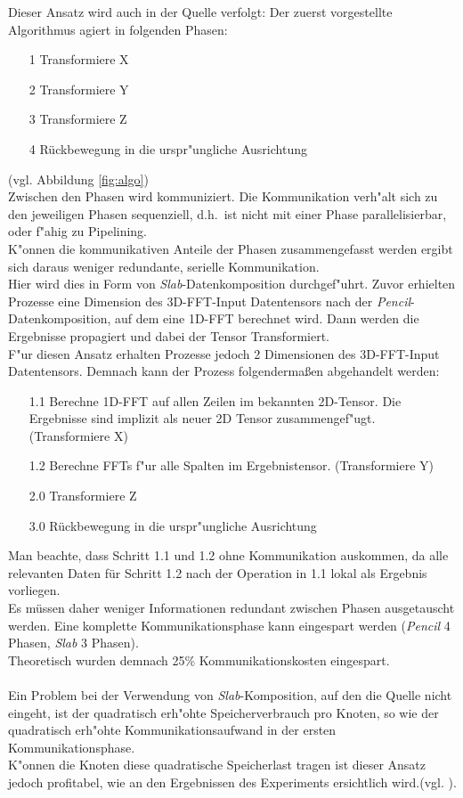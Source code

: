 Dieser Ansatz wird auch in der Quelle \cite{mainpaper} verfolgt:
Der zuerst vorgestellte Algorithmus agiert in folgenden Phasen:
\begin{itemize}
	\item[1] Transformiere X
	\item[2] Transformiere Y
	\item[3] Transformiere Z
	\item[4] Rückbewegung in die urspr"ungliche Ausrichtung
\end{itemize}
(vgl. Abbildung \ref{fig:algo})\\
Zwischen den Phasen wird kommuniziert. Die Kommunikation verh"alt sich zu den jeweiligen Phasen sequenziell, d.h.~ist nicht mit einer Phase parallelisierbar, oder f"ahig zu Pipelining.\\
K"onnen die kommunikativen Anteile der Phasen zusammengefasst werden ergibt sich daraus weniger redundante, serielle Kommunikation.\\
Hier wird dies in Form von \textit{Slab}-Datenkomposition durchgef"uhrt.
Zuvor erhielten Prozesse eine Dimension des 3D-FFT-Input Datentensors nach der \textit{Pencil}-Datenkomposition, auf dem eine 1D-FFT berechnet wird. Dann werden die Ergebnisse propagiert und dabei der Tensor Transformiert.\\
F"ur diesen Ansatz erhalten Prozesse jedoch 2 Dimensionen des 3D-FFT-Input Datentensors. Demnach kann der Prozess folgendermaßen abgehandelt werden:
\begin{itemize}
	\item[1.1] Berechne 1D-FFT auf allen Zeilen im bekannten 2D-Tensor. Die Ergebnisse sind implizit als neuer 2D Tensor zusammengef"ugt. (Transformiere X)
	\item[1.2] Berechne FFTs f"ur alle Spalten im Ergebnistensor. (Transformiere Y)
	\item[2.0] Transformiere Z
	\item[3.0] Rückbewegung in die urspr"ungliche Ausrichtung
\end{itemize}
Man beachte, dass Schritt 1.1 und 1.2 ohne Kommunikation auskommen, da alle relevanten Daten für Schritt 1.2 nach der Operation in 1.1 lokal als Ergebnis vorliegen.\\
Es müssen daher weniger Informationen redundant zwischen Phasen ausgetauscht werden. Eine komplette Kommunikationsphase kann eingespart werden (\textit{Pencil} 4 Phasen, \textit{Slab} 3 Phasen).\\
Theoretisch wurden demnach 25\% Kommunikationskosten eingespart.\\
\\
Ein Problem bei der Verwendung von \textit{Slab}-Komposition, auf den die Quelle \cite{mainpaper} nicht eingeht, ist der quadratisch erh"ohte Speicherverbrauch pro Knoten, so wie der quadratisch erh"ohte Kommunikationsaufwand in der ersten Kommunikationsphase.\\
K"onnen die Knoten diese quadratische Speicherlast tragen ist dieser Ansatz jedoch profitabel, wie an den Ergebnissen des Experiments ersichtlich wird.(vgl. \cite[Abb. 6]{mainpaper}).

